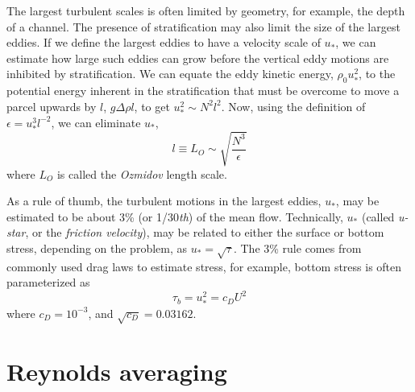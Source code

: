 \documentclass[11pt]{report}
\numberwithin{equation}{section}
\begin{document}
The largest turbulent scales is often limited by geometry, for example, the depth of a channel.  The presence of stratification may also limit the size of the largest eddies.  If we define the largest eddies to have a velocity scale of $u_*$, we can estimate how large such eddies can grow before the vertical eddy motions are inhibited by stratification.  We can equate the eddy kinetic energy, $\rho_0 u_*^2$, to the potential energy inherent in the stratification that must be overcome to move a parcel upwards by $l$, $g \Delta\rho l$, to get $u_*^2 \sim N^2 l^2$.  Now, using the definition of $\epsilon = u_*^3 l^{-2}$, we can eliminate $u_*$,
\begin{equation}
    l \equiv L_O \sim \sqrt{\frac{N^3}{\epsilon}}
\end{equation}
where $L_O$ is called the \emph{Ozmidov} length scale.

As a rule of thumb, the turbulent motions in the largest eddies, $u_*$, may be estimated to be about 3\% (or 1/30\emph{th}) of the mean flow.  Technically, $u_*$ (called \emph{u-star}, or the \emph{friction velocity}), may be related to either the surface or bottom stress, depending on the problem, as $u_* = \sqrt{\tau}$.  The 3\% rule comes from commonly used drag laws to estimate stress, for example, bottom stress is often parameterized as
\begin{equation}
    \tau_b = u_*^2 = c_D U^2
\end{equation}
where $c_D = 10^{-3}$, and $\sqrt{c_D} = 0.03162$.

\section{Reynolds averaging}
\end{document}
